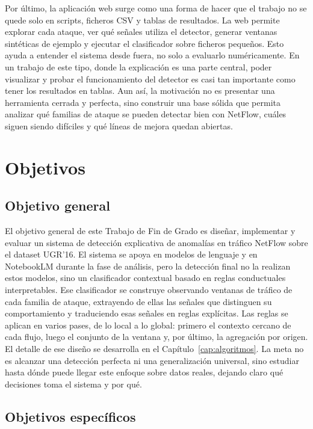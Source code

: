 Por último, la aplicación web surge como una forma de hacer que el trabajo no se quede solo en scripts, ficheros CSV y tablas de resultados. La web permite explorar cada ataque, ver qué señales utiliza el detector, generar ventanas sintéticas de ejemplo y ejecutar el clasificador sobre ficheros pequeños. Esto ayuda a entender el sistema desde fuera, no solo a evaluarlo numéricamente. En un trabajo de este tipo, donde la explicación es una parte central, poder visualizar y probar el funcionamiento del detector es casi tan importante como tener los resultados en tablas. Aun así, la motivación no es presentar una herramienta cerrada y perfecta, sino construir una base sólida que permita analizar qué familias de ataque se pueden detectar bien con NetFlow, cuáles siguen siendo difíciles y qué líneas de mejora quedan abiertas.

\section{Objetivos}
\label{sec:intro_objetivos}

\subsection{Objetivo general}
\label{sec:intro_obj_general}

El objetivo general de este Trabajo de Fin de Grado es diseñar, implementar y evaluar un sistema de detección explicativa de anomalías en tráfico NetFlow sobre el dataset UGR'16. El sistema se apoya en modelos de lenguaje y en NotebookLM durante la fase de análisis, pero la detección final no la realizan estos modelos, sino un clasificador contextual basado en reglas conductuales interpretables. Ese clasificador se construye observando ventanas de tráfico de cada familia de ataque, extrayendo de ellas las señales que distinguen su comportamiento y traduciendo esas señales en reglas explícitas. Las reglas se aplican en varios pases, de lo local a lo global: primero el contexto cercano de cada flujo, luego el conjunto de la ventana y, por último, la agregación por origen. El detalle de ese diseño se desarrolla en el Capítulo~\ref{cap:algoritmos}. La meta no es alcanzar una detección perfecta ni una generalización universal, sino estudiar hasta dónde puede llegar este enfoque sobre datos reales, dejando claro qué decisiones toma el sistema y por qué.

\subsection{Objetivos específicos}
\label{sec:intro_obj_especificos}

